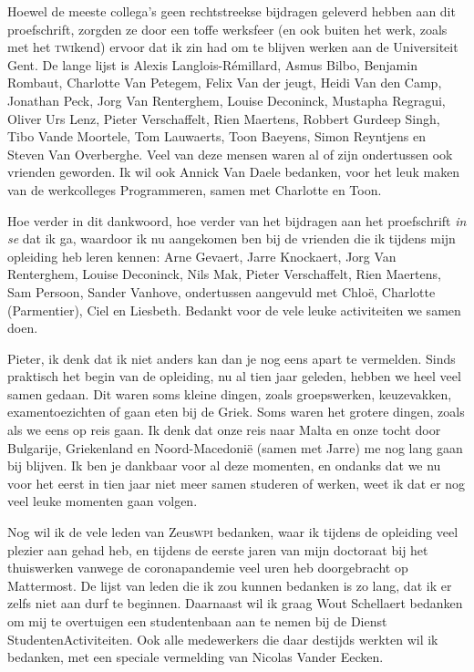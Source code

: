 \documentclass[main]{subfiles}
\begin{document}
Hoewel de meeste collega's geen rechtstreekse bijdragen geleverd hebben aan dit proefschrift, zorgden ze door een toffe werksfeer (en ook buiten het werk, zoals met het \textsc{twi}kend) ervoor dat ik zin had om te blijven werken aan de Universiteit Gent.
De lange lijst is Alexis Langlois-Rémillard, Asmus Bilbo, Benjamin Rombaut, Charlotte Van Petegem, Felix Van der jeugt, Heidi Van den Camp, Jonathan Peck, Jorg Van Renterghem, Louise Deconinck, Mustapha Regragui, Oliver Urs Lenz, Pieter Verschaffelt, Rien Maertens, Robbert Gurdeep Singh, Tibo Vande Moortele, Tom Lauwaerts, Toon Baeyens, Simon Reyntjens en Steven Van Overberghe.
Veel van deze mensen waren al of zijn ondertussen ook vrienden geworden.
Ik wil ook Annick Van Daele bedanken, voor het leuk maken van de werkcolleges Programmeren, samen met Charlotte en Toon.

Hoe verder in dit dankwoord, hoe verder van het bijdragen aan het proefschrift \textit{in se} dat ik ga, waardoor ik nu aangekomen ben bij de vrienden die ik tijdens mijn opleiding heb leren kennen: Arne Gevaert, Jarre Knockaert, Jorg Van Renterghem, Louise Deconinck, Nils Mak, Pieter Verschaffelt, Rien Maertens, Sam Persoon, Sander Vanhove, ondertussen aangevuld met Chloë, Charlotte (Parmentier), Ciel en Liesbeth.
Bedankt voor de vele leuke activiteiten we samen doen.

Pieter, ik denk dat ik niet anders kan dan je nog eens apart te vermelden.
Sinds praktisch het begin van de opleiding, nu al tien jaar geleden, hebben we heel veel samen gedaan.
Dit waren soms kleine dingen, zoals groepswerken, keuzevakken, examentoezichten of gaan eten bij de Griek.
Soms waren het grotere dingen, zoals als we eens op reis gaan.
Ik denk dat onze reis naar Malta en onze tocht door Bulgarije, Griekenland en Noord-Macedonië (samen met Jarre) me nog lang gaan bij blijven.
Ik ben je dankbaar voor al deze momenten, en ondanks dat we nu voor het eerst in tien jaar niet meer samen studeren of werken, weet ik dat er nog veel leuke momenten gaan volgen.

Nog wil ik de vele leden van Zeus\textsc{wpi} bedanken, waar ik tijdens de opleiding veel plezier aan gehad heb, en tijdens de eerste jaren van mijn doctoraat bij het thuiswerken vanwege de coronapandemie veel uren heb doorgebracht op Mattermost.
De lijst van leden die ik zou kunnen bedanken is zo lang, dat ik er zelfs niet aan durf te beginnen.
Daarnaast wil ik graag Wout Schellaert bedanken om mij te overtuigen een studentenbaan aan te nemen bij de Dienst StudentenActiviteiten.
Ook alle medewerkers die daar destijds werkten wil ik bedanken, met een speciale vermelding van Nicolas Vander Eecken.
\end{document}
